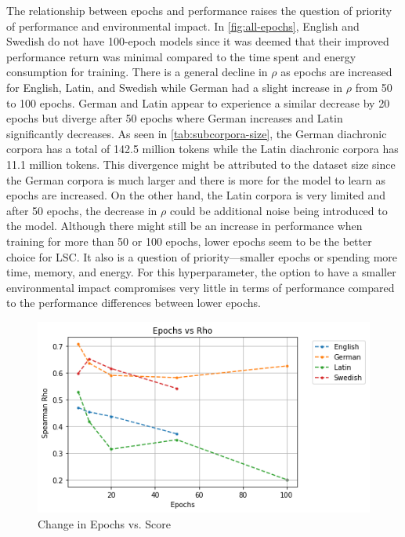 The relationship between epochs and performance raises the question of priority of performance and environmental impact. In \autoref{fig:all-epochs}, English and Swedish do not have 100-epoch models since it was deemed that their improved performance return was minimal compared to the time spent and energy consumption for training. There is a general decline in $\rho$ as epochs are increased for English, Latin, and Swedish while German had a slight increase in $\rho$ from 50 to 100 epochs. German and Latin appear to experience a similar decrease by 20 epochs but diverge after 50 epochs where German increases and Latin significantly decreases. As seen in \autoref{tab:subcorpora-size}, the German diachronic corpora has a total of 142.5 million tokens while the Latin diachronic corpora has 11.1 million tokens. This divergence might be attributed to the dataset size since the German corpora is much larger and there is more for the model to learn as epochs are increased.  On the other hand, the Latin corpora is very limited and after 50 epochs, the decrease in $\rho$ could be additional noise being introduced to the model. Although there might still be an increase in performance when training for more than 50 or 100 epochs, lower epochs seem to be the better choice for LSC. It also is a question of priority—smaller epochs or spending more time, memory, and energy. For this hyperparameter, the option to have a smaller environmental impact compromises very little in terms of performance compared to the performance differences between lower epochs. 

\begin{figure}[h]
  \centering
  \includegraphics[width=.8\linewidth]{sections/figures/epochs_all.png}
  \caption{Change in Epochs vs. Score}
  \label{fig:all-epochs}
\end{figure}

